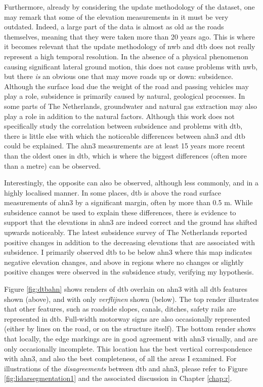 Furthermore, already by considering the update methodology of the dataset, one may remark that some of the elevation measurements in it must be very outdated. Indeed, a large part of the data is almost as old as the roads themselves, meaning that they were taken more than 20 years ago. This is where it becomes relevant that the update methodology of \ac{nwb} and \ac{dtb} does not really represent a high temporal resolution. In the absence of a physical phenomenon causing significant lateral ground motion, this does not cause problems with \ac{nwb}, but there \textit{is} an obvious one that may move roads up or down: subsidence. Although the surface load due the weight of the road and passing vehicles may play a role, subsidence is primarily caused by natural, geological processes. In some parts of The Netherlands, groundwater and natural gas extraction may also play a role in addition to the natural factors. Although this work does not specifically study the correlation between subsidence and problems with \ac{dtb}, there is little else with which the noticeable differences between \ac{ahn3} and \ac{dtb} could be explained. The \ac{ahn3} measurements are at least 15 years more recent than the oldest ones in \ac{dtb}, which is where the biggest differences (often more than a metre) can be observed.

Interestingly, the opposite can also be observed, although less commonly, and in a highly localised manner. In some places, \ac{dtb} is above the road surface measurements of \ac{ahn3} by a significant margin, often by more than 0.5 m. While subsidence cannot be used to explain these differences, there is evidence to support that the elevations in \ac{ahn3} are indeed correct and the ground has shifted upwards noticeably. The latest subsidence survey of The Netherlands reported positive changes in addition to the decreasing elevations that are associated with subsidence. I primarily observed \ac{dtb} to be below \ac{ahn3} where this map indicates negative elevation changes, and above in regions where no changes or slightly positive changes were observed in the subsidence study, verifying my hypothesis.

Figure \ref{fig:dtbahn} shows renders of \ac{dtb} overlain on \ac{ahn3} with all \ac{dtb} features shown (above), and with only \textit{verflijnen} shown (below). The top render illustrates that other features, such as roadside slopes, canals, ditches, safety rails are represented in \ac{dtb}. Full-width motorway signs are also occasionally represented (either by lines on the road, or on the structure itself). The bottom render shows that locally, the edge markings are in good agreement with \ac{ahn3} visually, and are only occasionally incomplete. This location has the best vertical correspondence with \ac{ahn3}, and also the best completeness, of all the areas I examined. For illustrations of the \textit{disagreements} between \ac{dtb} and \ac{ahn3}, please refer to Figure \ref{fig:lidarsegmentation1} and the associated discussion in Chapter \ref{chap:r}.

